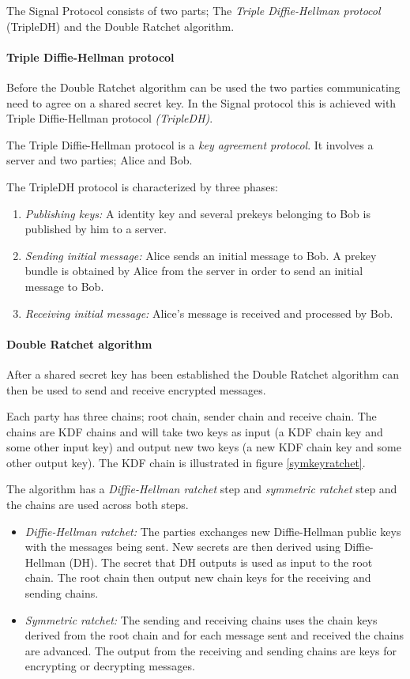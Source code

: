 The Signal Protocol consists of two parts; The \emph{Triple Diffie-Hellman protocol} (TripleDH) and the Double Ratchet algorithm.

\paragraph{Triple Diffie-Hellman protocol}\label{tripledh}
Before the Double Ratchet algorithm can be used the two parties communicating need to agree on a shared secret key. In the Signal protocol this is achieved with Triple Diffie-Hellman protocol \emph{(TripleDH)}.

The Triple Diffie-Hellman protocol is a \emph{key agreement protocol}. It involves a server and two parties; Alice and Bob. 

The TripleDH protocol is characterized by three phases:

\begin{enumerate}
	\item \emph{Publishing keys:} A identity key and several prekeys belonging to Bob is published by him to a server.
	\item \emph{Sending initial message:} Alice sends an initial message to Bob. A prekey bundle is obtained by Alice from the server in order to send an initial message to Bob.
	\item \emph{Receiving initial message:} Alice's message is received and processed by Bob.
\end{enumerate}


\paragraph{Double Ratchet algorithm}

After a shared secret key has been established the Double Ratchet algorithm can then be used to send and receive encrypted messages.

Each party has three chains; root chain, sender chain and receive chain. The chains are KDF chains and will take two keys as input (a KDF chain key and some other input key) and output new two keys (a new KDF chain key and some other output key). The KDF chain is illustrated in figure \ref{symkeyratchet}.

The algorithm has a \emph{Diffie-Hellman ratchet} step and \emph{symmetric ratchet} step and the chains are used across both steps.

\begin{itemize}
	\item \emph{Diffie-Hellman ratchet:} The parties exchanges new Diffie-Hellman public keys with the messages being sent. New secrets are then derived using Diffie-Hellman (DH). The secret that DH outputs is used as input to the root chain. The root chain then output new chain keys for the receiving and sending chains. 
	
	\item \emph{Symmetric ratchet:} The sending and receiving chains uses the chain keys derived from the root chain and for each message sent and received the chains are advanced. The output from the receiving and sending chains are keys for encrypting or decrypting messages. 
\end{itemize}


